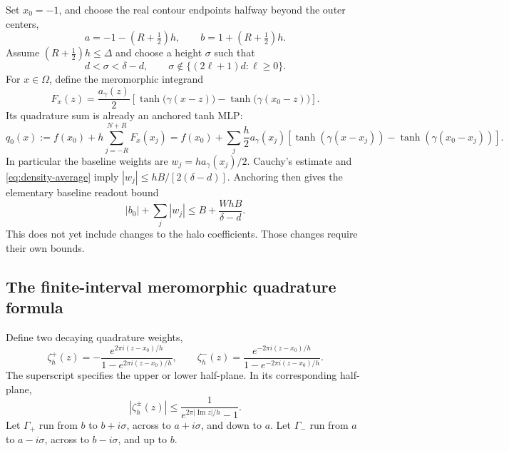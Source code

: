 \documentclass[11pt]{article}
\theoremstyle{definition}\newtheorem{definition}[theorem]{Definition}
\theoremstyle{remark}\newtheorem{remark}[theorem]{Remark}
\numberwithin{equation}{section}
\begin{document}
Set $x_0=-1$, and choose the real contour endpoints halfway beyond the outer centers,
\[
 a=-1-(R+\tfrac12)h,\qquad b=1+(R+\tfrac12)h.
\]
Assume $(R+\tfrac12)h\le\Delta$ and choose a height $\sigma$ such that
\begin{equation}
 d<\sigma<\delta-d,\qquad
 \sigma\notin\{(2\ell+1)d:\ell\ge0\}.
 \label{eq:contour-assumptions}
\end{equation}
For $x\in\Omega$, define the meromorphic integrand
\begin{equation}
 F_x(z)=\frac{a_\gamma(z)}2
 \left[\tanh\bigl(\gamma(x-z)\bigr)
       -\tanh\bigl(\gamma(x_0-z)\bigr)\right].
 \label{eq:integrand}
\end{equation}
Its quadrature sum is already an anchored tanh MLP:
\begin{equation}
 q_0(x):=f(x_0)+h\sum_{j=-R}^{N+R}F_x(x_j)
 =f(x_0)+\sum_j\frac h2a_\gamma(x_j)
 [\tanh(\gamma(x-x_j))-\tanh(\gamma(x_0-x_j))].
 \label{eq:q0}
\end{equation}
In particular the baseline weights are $w_j=ha_\gamma(x_j)/2$. Cauchy's estimate and \eqref{eq:density-average} imply $|w_j|\le hB/[2(\delta-d)]$. Anchoring then gives the elementary baseline readout bound
\begin{equation}
 |b_0|+\sum_j|w_j|\le B+\frac{WhB}{\delta-d}.
 \label{eq:baseline-readout}
\end{equation}
This does not yet include changes to the halo coefficients. Those changes require their own bounds.

\subsection{The finite-interval meromorphic quadrature formula}
Define two decaying quadrature weights,
\begin{equation}
 \zeta_h^+(z)=-\frac{e^{2\pi i(z-x_0)/h}}{1-e^{2\pi i(z-x_0)/h}},
 \qquad
 \zeta_h^-(z)=\frac{e^{-2\pi i(z-x_0)/h}}{1-e^{-2\pi i(z-x_0)/h}}.
 \label{eq:weights}
\end{equation}
The superscript specifies the upper or lower half-plane. In its corresponding half-plane,
\begin{equation}
 |\zeta_h^\pm(z)|\le\frac1{e^{2\pi|\operatorname{Im}z|/h}-1}.
 \label{eq:weight-bound}
\end{equation}
Let $\Gamma_+$ run from $b$ to $b+i\sigma$, across to $a+i\sigma$, and down to $a$. Let $\Gamma_-$ run from $a$ to $a-i\sigma$, across to $b-i\sigma$, and up to $b$.
\end{document}
